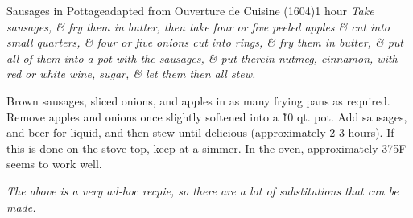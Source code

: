 \begin{recipe}{Sausages in Pottage}{adapted from Ouverture de Cuisine (1604)}{1 hour}
   {\it Take sausages, \& fry them in butter, then take four or five peeled apples \& cut into small quarters, \& four or five onions cut into rings, \& fry them in butter, \& put all of them into a pot with the sausages, \& put therein nutmeg, cinnamon, with red or white wine, sugar, \& let them then all stew. }
   
   Brown sausages, sliced onions, and apples in as many frying pans as required.  Remove apples and onions once slightly softened into a \~10 qt. pot.  Add sausages, and beer for liquid, and then stew until delicious (approximately 2-3 hours).  If this is done on the stove top, keep at a simmer.  In the oven, approximately 375F seems to work well. 
\end{recipe}
{\it The above is a very ad-hoc recpie, so there are a lot of substitutions
  that can be made.}
